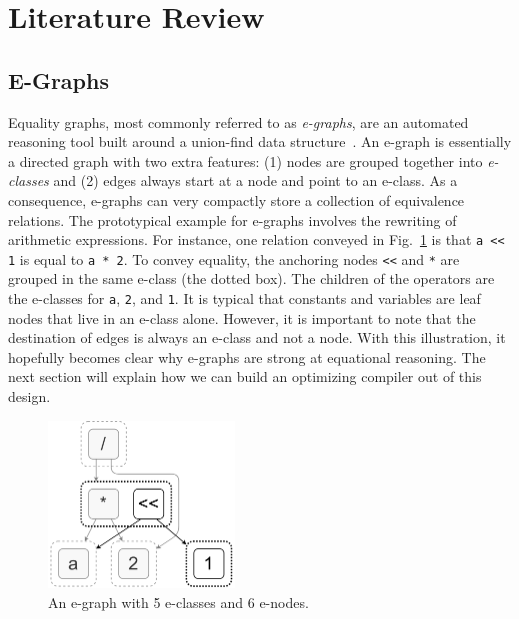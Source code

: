 \documentclass[10pt,letterpaper]{article}
\begin{document}
\section{Literature Review}\label{sec:background}
\subsection{E-Graphs}\label{sec:background:egraph}

Equality graphs, most commonly referred to as \textit{e-graphs}, are an
automated reasoning tool built around a union-find data
structure~\cite{eggpaper}. An e-graph is essentially a directed graph with two
extra features: (1) nodes are grouped together into \textit{e-classes} and (2)
edges always start at a node and point to an e-class. As a consequence,
e-graphs can very compactly store a collection of equivalence relations. The
prototypical example for e-graphs involves the rewriting of arithmetic
expressions. For instance, one relation conveyed in Fig.~\ref{fig:egraph} is
that \texttt{a << 1} is equal to \texttt{a * 2}. To convey equality, the
anchoring nodes \texttt{<<} and \texttt{*} are grouped in the same e-class (the
dotted box). The children of the operators are the e-classes for \texttt{a},
\texttt{2}, and \texttt{1}. It is typical that constants and variables are leaf
nodes that live in an e-class alone. However, it is important to note that the
destination of edges is always an e-class and not a node. With this
illustration, it hopefully becomes clear why e-graphs are strong at equational
reasoning. The next section will explain how we can build an optimizing
compiler out of this design.

\begin{figure}
    \centering
    \includegraphics[width=0.44\textwidth]{img/egraph.png}
    \caption{An e-graph with 5 e-classes and 6 e-nodes.}\label{fig:egraph}
\end{figure}
\end{document}
